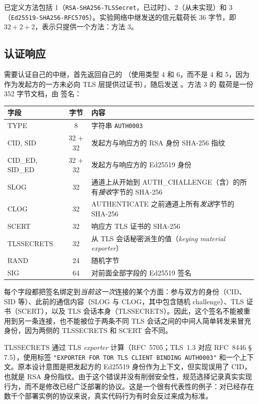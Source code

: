 已定义方法包括 1（\texttt{RSA-SHA256-TLSSecret}，已过时）、2（从未实现）和 3（\texttt{Ed25519-SHA256-RFC5705}）。实验网络中继发送的信元载荷长 36 字节，即 $32 + 2 + 2$，表示只提供一个方法：方法 3。

\subsection{认证响应}

需要认证自己的中继，首先返回自己的 （使用类型 4 和 6，而不是 4 和 5，因为作为发起方的一方未必向 TLS 层提供过证书），随后发送 。方法 3 的  载荷是一份 352 字节文档，由  签名：

\begin{center}\small
\begin{tabularx}{\textwidth}{@{}l c >{\raggedright\arraybackslash}X@{}}
\toprule
字段 & 字节 & 内容 \\
\midrule
TYPE & 8 & 字符串 \texttt{AUTH0003} \\
CID, SID & 32 + 32 & 发起方与响应方的 RSA 身份 SHA-256 指纹 \\
CID\_ED, SID\_ED & 32 + 32 & 发起方与响应方的 Ed25519 身份 \\
SLOG & 32 & 通道上从开始到 AUTH\_CHALLENGE（含）的所有\emph{接收}字节的 SHA-256 \\
CLOG & 32 & AUTHENTICATE 之前通道上所有\emph{发送}字节的 SHA-256 \\
SCERT & 32 & 响应方 TLS 证书的 SHA-256 \\
TLSSECRETS & 32 & 从 TLS 会话秘密派生的值（\emph{keying material exporter}） \\
RAND & 24 & 随机字节 \\
SIG & 64 & 对前面全部字段的 Ed25519 签名 \\
\bottomrule
\end{tabularx}
\end{center}

每个字段都把签名绑定到\emph{当前这一次}连接的某个方面：参与双方的身份（CID、SID 等）、此前的通信内容（SLOG 与 CLOG，其中包含随机 challenge）、TLS 证书（SCERT），以及 TLS 会话本身（TLSSECRETS）。因此，这个签名不能被重用到另一条连接，也不能被位于两条不同 TLS 会话之间的中间人简单转发来冒充身份，因为两侧的 TLSSECRETS 和 SCERT 会不同。

\begin{approfondimento}[被规范保留下来的一个实现错误]
TLSSECRETS 通过 TLS \emph{exporter} 计算（RFC~5705；TLS~1.3 对应 RFC~8446 §\,7.5），使用标签 \texttt{"EXPORTER FOR TOR TLS CLIENT BINDING AUTH0003"} 和一个上下文。原本设计意图是把发起方的 Ed25519 身份作为上下文，但实现误用了 CID，也就是 RSA 身份指纹。由于这个错误并没有削弱安全性，规范选择记录真实实现行为，而不是修改已经广泛部署的协议。这是一个很有代表性的例子：对已经存在数千个部署实例的协议来说，真实代码行为有时会反过来成为标准。
\end{approfondimento}

